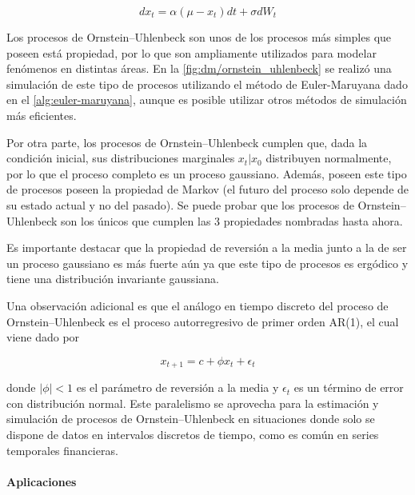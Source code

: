 \begin{equation}
    dx_t = \alpha(\mu-x_t) dt + \sigma dW_t
\end{equation}

Los procesos de Ornstein–Uhlenbeck son unos de los procesos más simples que poseen está propiedad, por lo que son ampliamente utilizados para modelar fenómenos en distintas áreas. En la \autoref{fig:dm/ornstein_uhlenbeck} se realizó una simulación de este tipo de procesos utilizando el método de Euler-Maruyana dado en el \autoref{alg:euler-maruyana}, aunque es posible utilizar otros métodos de simulación más eficientes.


Por otra parte, los procesos de Ornstein–Uhlenbeck cumplen que, dada la condición inicial, sus distribuciones marginales $x_t|x_0$ distribuyen normalmente, por lo que el proceso completo es un proceso gaussiano. Además, poseen este tipo de procesos poseen la propiedad de Markov (el futuro del proceso solo depende de su estado actual y no del pasado). Se puede probar que los procesos de Ornstein–Uhlenbeck son los únicos que cumplen las 3 propiedades nombradas hasta ahora.

Es importante destacar que la propiedad de reversión a la media junto a la de ser un proceso gaussiano es más fuerte aún ya que este tipo de procesos es ergódico y tiene una distribución invariante gaussiana.

Una observación adicional es que el análogo en tiempo discreto del proceso de Ornstein–Uhlenbeck es el proceso autorregresivo de primer orden AR(1), el cual viene dado por

\begin{equation}
    x_{t+1} = c + \phi x_t + \epsilon_t
\end{equation}

donde $|\phi|<1$ es el parámetro de reversión a la media y $\epsilon_t$ es un término de error con distribución normal. Este paralelismo se aprovecha para la estimación y simulación de procesos de Ornstein–Uhlenbeck en situaciones donde solo se dispone de datos en intervalos discretos de tiempo, como es común en series temporales financieras.

\paragraph{Aplicaciones}


